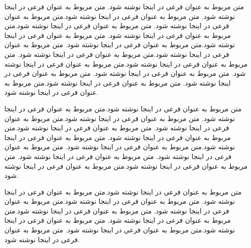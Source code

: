     متن مربوط به عنوان فرعی در اینجا نوشته شود. متن مربوط به عنوان فرعی در اینجا نوشته شود. متن مربوط به عنوان فرعی در اینجا نوشته شود.متن مربوط به عنوان فرعی در اینجا نوشته شود. متن مربوط به عنوان فرعی در اینجا نوشته شود.متن مربوط به عنوان فرعی در اینجا نوشته شود. متن مربوط به عنوان فرعی در اینجا نوشته شود.متن مربوط به عنوان فرعی در اینجا نوشته شود. متن مربوط به عنوان فرعی در اینجا نوشته شود.متن مربوط به عنوان فرعی در اینجا نوشته شود. متن مربوط به عنوان فرعی در اینجا نوشته شود.متن مربوط به عنوان فرعی در اینجا نوشته شود. متن مربوط به عنوان فرعی در اینجا نوشته شود. متن مربوط به عنوان فرعی در اینجا نوشته شود. متن مربوط به عنوان فرعی در اینجا نوشته شود.متن مربوط به عنوان فرعی در اینجا نوشته شود. 
    
    متن مربوط به عنوان فرعی در اینجا نوشته شود.متن مربوط به عنوان فرعی در اینجا نوشته شود. متن مربوط به عنوان فرعی در اینجا نوشته شود.متن مربوط به عنوان فرعی در اینجا نوشته شود. متن مربوط به عنوان فرعی در اینجا نوشته شود.متن مربوط به عنوان فرعی در اینجا نوشته شود. متن مربوط به عنوان فرعی در اینجا نوشته شود.متن مربوط به عنوان فرعی در اینجا نوشته شود. متن مربوط به عنوان فرعی در اینجا نوشته شود. متن مربوط به عنوان فرعی در اینجا نوشته شود. متن مربوط به عنوان فرعی در اینجا نوشته شود.متن مربوط به عنوان فرعی در اینجا نوشته شود. 
    
    متن مربوط به عنوان فرعی در اینجا نوشته شود.متن مربوط به عنوان فرعی در اینجا نوشته شود. متن مربوط به عنوان فرعی در اینجا نوشته شود.متن مربوط به عنوان فرعی در اینجا نوشته شود. متن مربوط به عنوان فرعی در اینجا نوشته شود.متن مربوط به عنوان فرعی در اینجا نوشته شود. متن مربوط به عنوان فرعی در اینجا نوشته شود.متن مربوط به عنوان فرعی در اینجا نوشته شود. متن مربوط به عنوان فرعی در اینجا نوشته شود.
